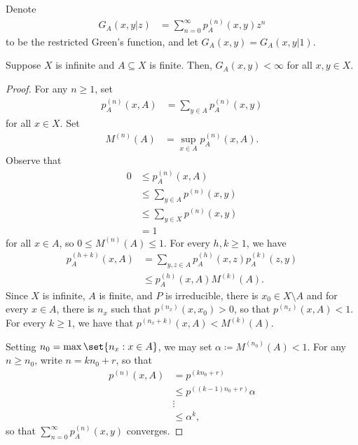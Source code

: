 \documentclass[10pt]{mypackage}
\renewcommand{\coloneq}{\coloneqq}
\begin{document}
Denote
\begin{align*}
  G_A\left( x,y|z \right) &= \sum_{n=0}^{\infty}p_A^{(n)}\left( x,y \right)z^{n}
\end{align*}
to be the restricted Green's function, and let $G_A\left( x,y \right) = G_A\left( x,y|1 \right)$.
\begin{lemma}
  Suppose $X$ is infinite and $A\subseteq X$ is finite. Then, $G_A\left( x,y \right) < \infty$ for all $x,y\in X$.
\end{lemma}
\begin{proof}
  For any $n\geq 1$, set
  \begin{align*}
    p_A^{(n)}\left( x,A \right) &= \sum_{y\in A} p^{(n)}_A\left( x,y \right)
  \end{align*}
  for all $x\in X$. Set
  \begin{align*}
    M^{(n)}\left( A \right) &= \sup_{x\in A} p^{(n)}_A\left( x,A \right).
  \end{align*}
  Observe that
  \begin{align*}
    0 &\leq p_A^{(n)}\left( x,A \right)\\
      &\leq \sum_{y\in A}p^{(n)}\left( x,y \right)\\
      &\leq \sum_{y\in X}p^{(n)}\left( x,y \right)\\
      &= 1
  \end{align*}
  for all $x\in A$, so $0\leq M^{(n)}(A) \leq 1$. For every $h,k\geq 1$, we have
  \begin{align*}
    p_A^{(h + k)}\left( x,A \right) &= \sum_{y,z\in A}p_A^{(h)}\left( x,z \right)p_A^{(k)}\left( z,y \right)\\
                                    &\leq p_A^{(h)}\left( x,A \right)M^{(k)}\left( A \right).
  \end{align*}
  Since $X$ is infinite, $A$ is finite, and $P$ is irreducible, there is $x_0\in X\setminus A$ and for every $x\in A$, there is $n_x$ such that $p^{\left(n_x\right)}\left( x,x_0 \right) > 0$, so that $p^{\left( n_x \right)}\left( x,A \right) < 1$. For every $k\geq 1$, we have that $p^{\left( n_x+k \right)}\left( x,A \right) < M^{(k)}\left( A \right)$.

  Setting $n_0 = \max\set{n_x : x\in A}$, we may set $\alpha\coloneq M^{\left( n_0 \right)}\left( A \right) < 1$. For any $n\geq n_0$, write $n = kn_0 + r$, so that
  \begin{align*}
    p^{(n)}\left( x,A \right) &= p^{\left( kn_0 + r \right)}\\
                              &\leq p^{(\left( k-1 \right)n_0 + r)}\alpha\\
                              &\vdots\\
                              &\leq \alpha^{k},
  \end{align*}
  so that $\sum_{n=0}^{\infty}p^{(n)}_A\left( x,y \right)$ converges.
\end{proof}
\end{document}
